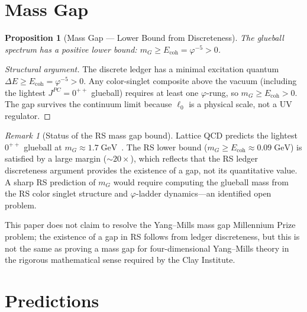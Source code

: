 \documentclass[12pt,a4paper]{article}
\newtheorem{proposition}[theorem]{Proposition}
\theoremstyle{definition}
\theoremstyle{remark}
\newtheorem{remark}[theorem]{Remark}
\begin{document}
\section{Mass Gap}
\label{sec:gap}

\begin{proposition}[Mass Gap --- Lower Bound from Discreteness]
\label{thm:gap}
The glueball spectrum has a positive lower bound:
$m_G \geq E_{\mathrm{coh}} = \varphi^{-5} > 0$.
\end{proposition}

\begin{proof}[Structural argument]
The discrete ledger has a minimal excitation quantum
$\Delta E \geq E_{\mathrm{coh}} = \varphi^{-5} > 0$.  Any
color-singlet composite above the vacuum (including the lightest
$J^{PC} = 0^{++}$ glueball) requires at least one $\varphi$-rung,
so $m_G \geq E_{\mathrm{coh}} > 0$.  The gap survives the
continuum limit because $\ell_0$ is a physical scale, not a
UV regulator.
\end{proof}

\begin{remark}[Status of the RS mass gap bound]
\label{rem:gap-status}
Lattice QCD predicts the lightest $0^{++}$ glueball at
$m_G \approx 1.7\;\mathrm{GeV}$~\cite{Morningstar1999}.
The RS lower bound ($m_G \geq E_{\mathrm{coh}} \approx 0.09\;\mathrm{GeV}$)
is satisfied by a large margin ($\sim 20 \times$), which reflects
that the RS ledger discreteness argument provides the existence of a
gap, not its quantitative value.  A sharp RS prediction of $m_G$ would
require computing the glueball mass from the RS color singlet structure
and $\varphi$-ladder dynamics---an identified open problem.

This paper does not claim to resolve the Yang--Mills mass gap Millennium
Prize problem; the existence of a gap in RS follows from ledger
discreteness, but this is not the same as proving a mass gap for
four-dimensional Yang--Mills theory in the rigorous mathematical sense
required by the Clay Institute.
\end{remark}

\section{Predictions}
\label{sec:predictions}
\end{document}
